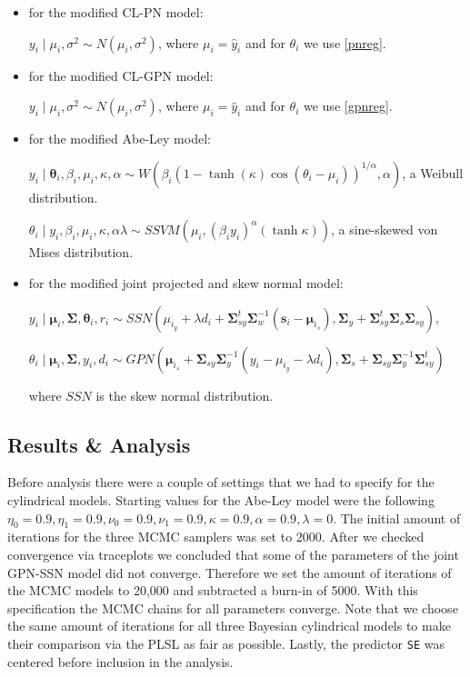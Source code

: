 \documentclass[11pt,]{article}
\begin{document}
\begin{itemize}
\item for the modified CL-PN model:

$y_i \mid \mu_i, \sigma^2 \sim N(\mu_i, \sigma^2)$, where $\mu_i = \hat{y}_i$ and for $\theta_i$ we use \eqref{pnreg}.

\item for the modified CL-GPN model:

$y_i \mid \mu_i, \sigma^2 \sim N(\mu_i, \sigma^2)$, where $\mu_i = \hat{y}_i$ and for $\theta_i$ we use \eqref{gpnreg}.

\item for the modified Abe-Ley model:

$y_i \mid \boldsymbol{\theta}_i, \beta_i, \mu_i, \kappa, \alpha \sim W\left(\beta_i(1-\tanh(\kappa)\cos(\theta_i - \mu_i))^{1/\alpha}, \alpha\right)$, a Weibull distribution.

$\theta_i \mid y_i, \beta_i, \mu_i, \kappa, \alpha \lambda \sim SSVM\left(\mu_i, (\beta_iy_i)^{\alpha}(\tanh{\kappa})\right)$, a sine-skewed von Mises distribution.

\item for the modified joint projected and skew normal model:

$y_i \mid \boldsymbol{\mu}_i, \boldsymbol{\Sigma}, \boldsymbol{\theta}_i, r_i \sim SSN(\mu_{i_y} + \lambda d_i + \boldsymbol{\Sigma}_{sy}^t\boldsymbol{\Sigma}_w^{-1}(\boldsymbol{s}_i - \boldsymbol{\mu}_{i_s}), \boldsymbol{\Sigma}_y + \boldsymbol{\Sigma}_{sy}^t\boldsymbol{\Sigma}_s\boldsymbol{\Sigma}_{sy}),$

$\theta_i \mid \boldsymbol{\mu}_i, \boldsymbol{\Sigma}, y_i, d_i \sim GPN(\boldsymbol{\mu}_{i_s} + \boldsymbol{\Sigma}_{sy}\boldsymbol{\Sigma}_y^{-1} (y_i - \mu_{i_y} - \lambda d_i), \boldsymbol{\Sigma}_s + \boldsymbol{\Sigma}_{sy}\boldsymbol{\Sigma}_y^{-1}\boldsymbol{\Sigma}_{sy}^t)$

where $SSN$ is the skew normal distribution.

\end{itemize}

\subsection{Results \& Analysis}\label{DataResults}

Before analysis there were a couple of settings that we had to specify
for the cylindrical models. Starting values for the Abe-Ley model were
the following
\(\eta_0 = 0.9, \eta_1 = 0.9, \nu_0 = 0.9, \nu_1 = 0.9, \kappa = 0.9, \alpha = 0.9, \lambda = 0\).
The initial amount of iterations for the three MCMC samplers was set to
2000. After we checked convergence via traceplots we concluded that some
of the parameters of the joint GPN-SSN model did not converge. Therefore
we set the amount of iterations of the MCMC models to 20,000 and
subtracted a burn-in of 5000. With this specification the MCMC chains
for all parameters converge. Note that we choose the same amount of
iterations for all three Bayesian cylindrical models to make their
comparison via the PLSL as fair as possible. Lastly, the predictor
\verb|SE| was centered before inclusion in the analysis.
\end{document}
